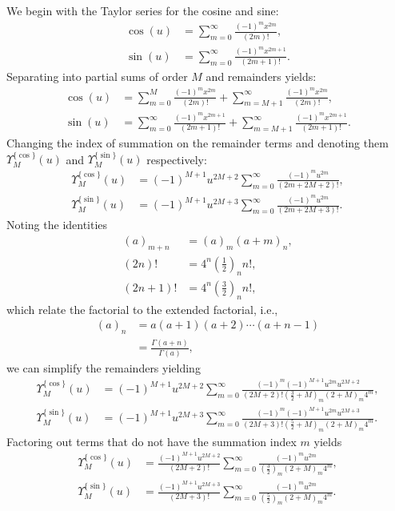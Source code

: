 We begin with the Taylor series for the cosine and sine:
\begin{align}
	\cos(u) &= \sum_{m=0}^\infty \frac{(-1)^m x^{2m}}{(2m)!}, \\
	\sin(u) &= \sum_{m=0}^\infty \frac{(-1)^m x^{2m+1}}{(2m+1)!}.
\end{align}
Separating into partial sums of order $M$ and remainders yields:
\begin{align}
	\cos(u) &= \sum_{m=0}^M \frac{(-1)^m x^{2m}}{(2m)!}
	    + \sum_{m=M+1}^{\infty}\frac{(-1)^m x^{2m}}{(2m)!}, \\
	\sin(u) &= \sum_{m=0}^\infty \frac{(-1)^m x^{2m+1}}{(2m+1)!}
	    + \sum_{m=M+1}^{\infty}\frac{(-1)^m x^{2m+1}}{(2m+1)!}.
\end{align}
Changing the index of summation on the remainder terms and denoting them $\Upsilon_M^{\{\cos\}}(u)$ and $\Upsilon_M^{\{\sin\}}(u)$ respectively:
\begin{align}
	\Upsilon_M^{\{\cos\}}(u) &= 
	(-1)^{M+1} u^{2M+2}
	\sum_{m=0}^{\infty}
	\frac{(-1)^m u^{2m}}{(2m+2M+2)!}, \\
	\Upsilon_M^{\{\sin\}}(u) &= 
	(-1)^{M+1} u^{2M+3}
	\sum_{m=0}^{\infty}
	\frac{(-1)^m u^{2 m}}{(2m+2M+3)!}.
\end{align}
Noting the identities
\begin{align}
	(a)_{m+n} &= (a)_m(a+m)_n, \\
	(2n)! &= 4^n \left(\frac{1}{2}\right)_n n!, \\
	(2n+1)! &= 4^n \left(\frac{3}{2}\right)_n n!,
\end{align}
which relate the factorial to the extended factorial, i.e.,
\begin{align}
	(a)_n &= a(a+1)(a+2) \cdots (a+n-1) \\
	    &= \frac{\Gamma(a+n)}{\Gamma(a)},
\end{align}
we can simplify the remainders yielding
\begin{align}
	\Upsilon_M^{\{\cos\}}(u) &= 
	(-1)^{M+1} u^{2M+2}
	\sum_{m=0}^{\infty}
	\frac{(-1)^m (-1)^{M+1} u^{2m} u^{2M+2}}{(2M+2)!\left(\frac{3}{2}+M\right)_m (2+M)_m 4^m}, \\
	\Upsilon_M^{\{\sin\}}(u) &= 
	(-1)^{M+1} u^{2M+3}
	\sum_{m=0}^{\infty}
	\frac{(-1)^m (-1)^{M+1} u^{2m} u^{2M+3}}{(2M+3)!\left(\frac{5}{2}+M\right)_m (2+M)_m 4^m}.
\end{align}
Factoring out terms that do not have the summation index $m$ yields
\begin{align}
	\Upsilon_M^{\{\cos\}}(u) &= 
	\frac{(-1)^{M+1}u^{2M+2}}{(2M+2)!}
	\sum_{m=0}^{\infty}
	\frac{(-1)^m u^{2m}}{\left(\frac{3}{2}\right)_m(2+M)_m 4^m}, \\
	\Upsilon_M^{\{\sin\}}(u) &= 
	\frac{(-1)^{M+1}u^{2M+3}}{(2M+3)!}
	\sum_{m=0}^{\infty}
	\frac{(-1)^m u^{2m}}{\left(\frac{5}{2}\right)_m(2+M)_m 4^m}.
\end{align}
